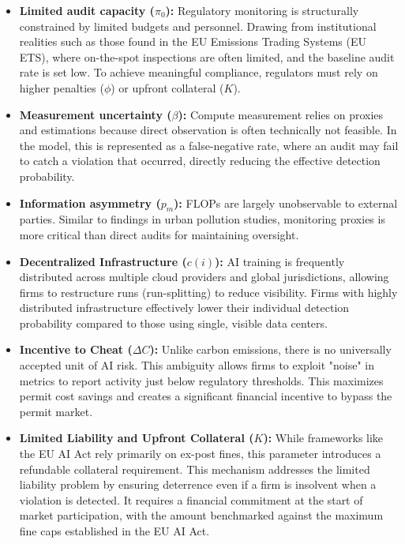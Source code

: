 \begin{itemize}
    \item \textbf{Limited audit capacity ($\pi_0$):} Regulatory monitoring is structurally constrained by limited budgets and personnel. Drawing from institutional realities such as those found in the EU Emissions Trading Systems (EU ETS), where on-the-spot inspections are often limited, and the baseline audit rate is set low. To achieve meaningful compliance, regulators must rely on higher penalties ($\phi$) or upfront collateral ($K$). 
    
    \item \textbf{Measurement uncertainty ($\beta$):} Compute measurement relies on proxies and estimations because direct observation is often technically not feasible. In the model, this is represented as a false-negative rate, where an audit may fail to catch a violation that occurred, directly reducing the effective detection probability. 
    
    \item \textbf{Information asymmetry ($p_m$):} FLOPs are largely unobservable to external parties. Similar to findings in urban pollution studies, monitoring proxies is more critical than direct audits for maintaining oversight.
    
    \item \textbf{Decentralized Infrastructure ($c(i)$):} AI training is frequently distributed across multiple cloud providers and global jurisdictions, allowing firms to restructure runs (run-splitting) to reduce visibility. Firms with highly distributed infrastructure effectively lower their individual detection probability compared to those using single, visible data centers.
    
    \item \textbf{Incentive to Cheat ($\Delta C$):} Unlike carbon emissions, there is no universally accepted unit of AI risk. This ambiguity allows firms to exploit "noise" in metrics to report activity just below regulatory thresholds. This maximizes permit cost savings and creates a significant financial incentive to bypass the permit market.
    
    \item \textbf{Limited Liability and Upfront Collateral ($K$):} While frameworks like the EU AI Act rely primarily on ex-post fines, this parameter introduces a refundable collateral requirement. This mechanism addresses the limited liability problem by ensuring deterrence even if a firm is insolvent when a violation is detected. It requires a financial commitment at the start of market participation, with the amount benchmarked against the maximum fine caps established in the EU AI Act.
\end{itemize}

